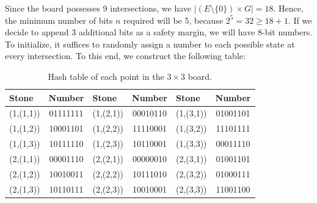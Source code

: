 Since the board possesses 9 intersections, we have \(|(E\setminus\{0\}) \times G| = 18\). Hence, the minimum number of bits \(n\) required will be 5, because \(2^5 = 32 \geq 18 + 1\). If we decide to append 3 additional bits as a safety margin, we will have 8-bit numbers. To initialize, it suffices to randomly assign a number to each possible state at every intersection. To this end, we construct the following table:
\begin{table}[H]
	\centering
	\small
	\begin{tabular}{lc|lc|lc}
		\textbf{Stone} & \textbf{Number} & \textbf{Stone} & \textbf{Number} & \textbf{Stone} & \textbf{Number} \\ \hline
		(1,(1,1)) & 01111111 & (1,(2,1)) & 00010110 & (1,(3,1)) & 01001101 \\
		(1,(1,2)) & 10001101 & (1,(2,2)) & 11110001 & (1,(3,2)) & 11101111 \\
		(1,(1,3)) & 10111110 & (1,(2,3)) & 10110001 & (1,(3,3)) & 00011110 \\
		(2,(1,1)) & 00001110 & (2,(2,1)) & 00000010 & (2,(3,1)) & 01001101 \\
		(2,(1,2)) & 10010011 & (2,(2,2)) & 10111010 & (2,(3,2)) & 01000111 \\
		(2,(1,3)) & 10110111 & (2,(2,3)) & 10010001 & (2,(3,3)) & 11001100 \\
	\end{tabular}
	\caption{Hash table of each point in the $3\times 3$ board.}
	\label{tablahash}
\end{table}

